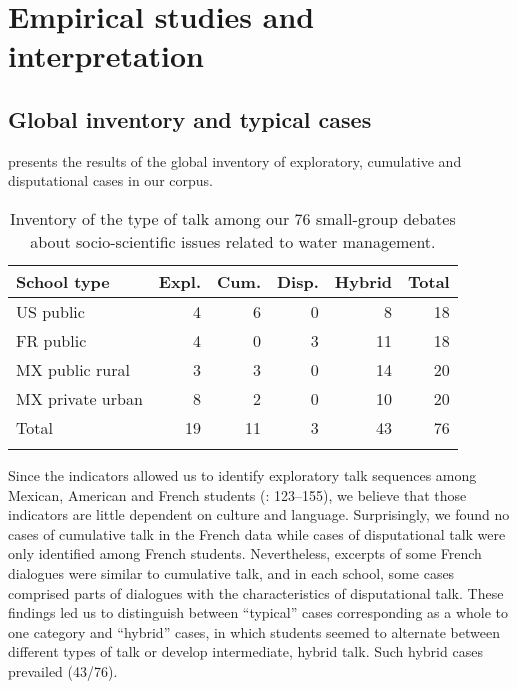 \documentclass[output=paper]{langscibook}
\begin{document}
\section{Empirical studies and interpretation}
\subsection{Global inventory and typical cases}

 presents the results of the global inventory of exploratory, cumulative and disputational cases in our corpus.

\begin{table}
\caption{Inventory of the type of talk among our 76 small-group debates about socio-scientific issues related to water management.\label{tab:11:1}}
\begin{tabular}{lrrrrr}
\lsptoprule School type & Expl. & Cum. & Disp. & Hybrid & Total\\\midrule
US public  & 4 & 6 & 0 & 8 & {18}\\
FR public  & 4 & 0 & 3 & 11 & {18}\\
MX public rural  & 3 & 3 & 0 & 14 & {20}\\
MX private urban  & 8 & 2 & 0 & 10 & {20}\\\midrule
Total & {19} & {11} & {3} & {43} & {76}\\
\lspbottomrule
\end{tabular}
\end{table}


Since the indicators allowed us to identify exploratory talk sequences among Mexican, American and French students (\citealt{Polo2014}: 123--155), we believe that those indicators are little dependent on culture and language. Surprisingly, we found no cases of cumulative talk in the French data while cases of disputational talk were only identified among French students. Nevertheless, excerpts of some French dialogues were similar to cumulative talk, and in each school, some cases comprised parts of dialogues with the characteristics of disputational talk. These findings led us to distinguish between “typical” cases corresponding as a whole to one category and “hybrid” cases, in which students seemed to alternate between different types of talk or develop intermediate, hybrid talk. Such hybrid cases prevailed (43/76).
\end{document}
